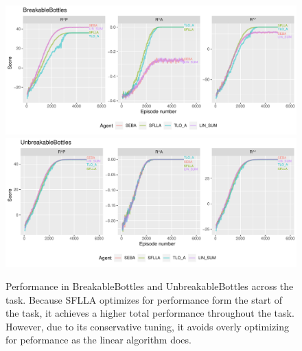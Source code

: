\begin{figure}

  \includegraphics[width=\columnwidth]{output/multirun_n100_eeba_rolf_default_scale_progress_BreakableBottles.pdf}
  \includegraphics[width=\columnwidth]{output/multirun_n100_eeba_rolf_default_scale_progress_UnbreakableBottles.pdf}
  \caption{Performance in BreakableBottles and UnbreakableBottles across the task. Because SFLLA optimizes for performance form the start of the task, it achieves a higher total performance throughout the task. However, due to its conservative tuning, it avoids overly optimizing for peformance as the linear algorithm does.
  }
   \label{fig:bb_performance}
 \end{figure}



 
